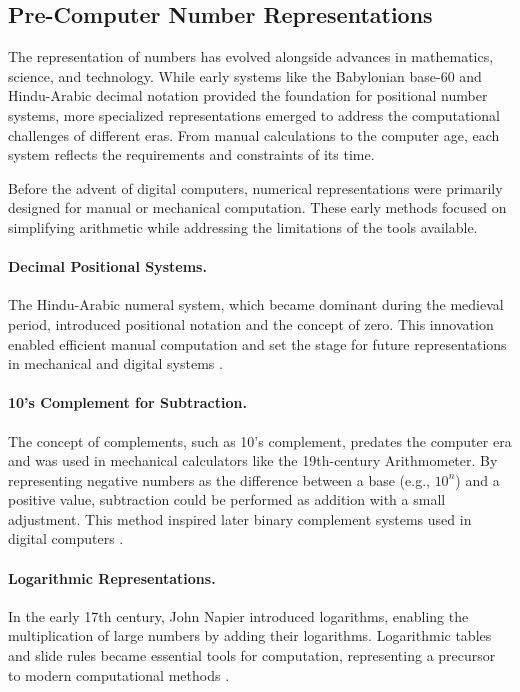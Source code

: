 \subsection{Pre-Computer Number Representations}

The representation of numbers has evolved alongside advances in mathematics, science, and technology. While early systems like the Babylonian base-60 and Hindu-Arabic decimal notation provided the foundation for positional number systems, more specialized representations emerged to address the computational challenges of different eras. From manual calculations to the computer age, each system reflects the requirements and constraints of its time.

Before the advent of digital computers, numerical representations were primarily designed for manual or mechanical computation. These early methods focused on simplifying arithmetic while addressing the limitations of the tools available.

\paragraph{Decimal Positional Systems.}
The Hindu-Arabic numeral system, which became dominant during the medieval period, introduced positional notation and the concept of zero. This innovation enabled efficient manual computation and set the stage for future representations in mechanical and digital systems \cite{ifrah2000, burton2010-history}.

\paragraph{10's Complement for Subtraction.}
The concept of complements, such as 10's complement, predates the computer era and was used in mechanical calculators like the 19th-century Arithmometer. By representing negative numbers as the difference between a base (e.g., \( 10^n \)) and a positive value, subtraction could be performed as addition with a small adjustment. This method inspired later binary complement systems used in digital computers \cite{randell1982origins}.

\paragraph{Logarithmic Representations.}
In the early 17th century, John Napier introduced logarithms, enabling the multiplication of large numbers by adding their logarithms. Logarithmic tables and slide rules became essential tools for computation, representing a precursor to modern computational methods \cite{stewart2008-taming}.

